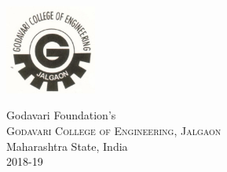 \begin{titlepage}




 
\includegraphics[width=3cm]{logo.jpg}


\vfill %

\normalsize Godavari Foundation's\\[0.5cm]
\textsc{\normalsize Godavari College of Engineering, Jalgaon}\\[0.5cm]
\normalsize Maharashtra State, India\\[0.5cm]
\normalsize 2018-19\\[0.5cm]
\end{titlepage}
 